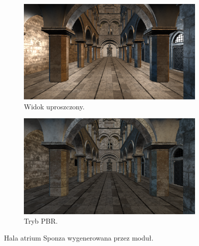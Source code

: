 	
\begin{figure}[h!]
	\begin{subfigure}{.5\textwidth}
		\centering
		\includegraphics[width=\textwidth]{images/demo_sponza_1.png}
		\caption{Widok uproszczony.}
	\end{subfigure}
	\begin{subfigure}{.5\textwidth}
		\centering
		\includegraphics[width=\textwidth]{images/demo_sponza_1_pbr.png}
		\caption{Tryb PBR.}
	\end{subfigure}
	\caption{Hala atrium Sponza wygenerowana przez moduł.}
	\label{test_sponza_1}
\end{figure}


